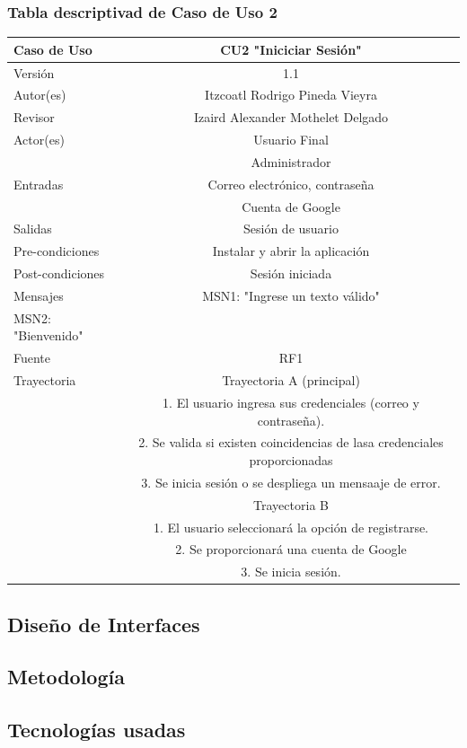\documentclass{article}
\begin{document}
\subsubsection{Tabla descriptivad de Caso de Uso 2}
\begin{tabular}{|M{5cm}|c|}
\hline
Caso de Uso & CU2 "Iniciciar Sesión"\\ \hline
Versión & 1.1\\ \hline
Autor(es) & Itzcoatl Rodrigo Pineda Vieyra\\ \hline
Revisor & Izaird Alexander Mothelet Delgado \\ \hline
Actor(es) & Usuario Final \\ & Administrador\\ \hline
Entradas &  Correo electrónico, contraseña\\ & Cuenta de Google \\ \hline
Salidas & Sesión de usuario \\ \hline
Pre-condiciones & Instalar y abrir la aplicación \\ \hline
Post-condiciones & Sesión iniciada\\ \hline
Mensajes & MSN1: "Ingrese un texto válido"\\
		   MSN2: "Bienvenido"\\ \hline
Fuente & RF1 \\ \hline	
	Trayectoria & Trayectoria A (principal)\\
		& 1.   El usuario ingresa sus credenciales (correo y contraseña).\\
		& 2.   Se valida si existen coincidencias de lasa credenciales proporcionadas\\
		& 3. Se inicia sesión o se despliega un mensaaje de error.\\
	& Trayectoria B\\
	& 1.   El usuario seleccionará la opción de registrarse.\\
	& 2.   Se proporcionará una cuenta de Google\\
	& 3.   Se inicia sesión.\\ \hline
\end{tabular}
\subsection{Diseño de Interfaces}
\subsection{Metodología}
\subsection{Tecnologías usadas}
\printbibliography
\end{document}
